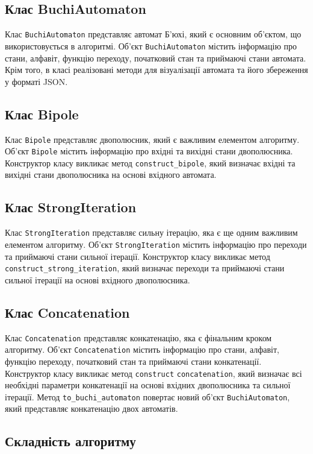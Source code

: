 \documentclass[12pt,a4paper]{article}
\begin{document}
\subsection*{Клас BuchiAutomaton}
Клас \texttt{BuchiAutomaton} представляє автомат Б'юхі, який є основним об'єктом, що використовується в алгоритмі. Об'єкт \texttt{BuchiAutomaton} містить інформацію про стани, алфавіт, функцію переходу, початковий стан та приймаючі стани автомата. Крім того, в класі реалізовані методи для візуалізації автомата та його збереження у форматі JSON.

\subsection*{Клас Bipole}
Клас \texttt{Bipole} представляє двополюсник, який є важливим елементом алгоритму. Об'єкт \texttt{Bipole} містить інформацію про вхідні та вихідні стани двополюсника. Конструктор класу викликає метод \verb|construct_bipole|, який визначає вхідні та вихідні стани двополюсника на основі вхідного автомата.

\subsection*{Клас StrongIteration}
Клас \texttt{StrongIteration} представляє сильну ітерацію, яка є ще одним важливим елементом алгоритму. Об'єкт \texttt{StrongIteration} містить інформацію про переходи та приймаючі стани сильної ітерації. Конструктор класу викликає метод \verb|construct_strong_iteration|, який визначає переходи та приймаючі стани сильної ітерації на основі вхідного двополюсника.

\subsection*{Клас Concatenation}
Клас \texttt{Concatenation} представляє конкатенацію, яка є фінальним кроком алгоритму. Об'єкт \texttt{Concatenation} містить інформацію про стани, алфавіт, функцію переходу, початковий стан та приймаючі стани конкатенації. Конструктор класу викликає метод \verb|construct| \verb|concatenation|, який визначає всі необхідні параметри конкатенації на основі вхідних двополюсника та сильної ітерації. Метод \verb|to_buchi_automaton| повертає новий об'єкт \texttt{BuchiAutomaton}, який представляє конкатенацію двох автоматів.

\subsection*{Складність алгоритму} \\
\end{document}
